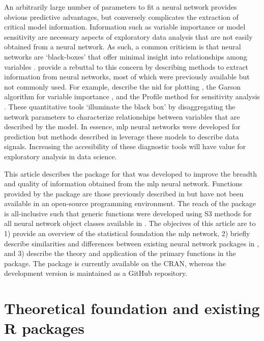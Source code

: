 \documentclass[article,shortnames]{jss}\usepackage[]{graphicx}\usepackage[]{color}
\begin{document}
An arbitrarily large number of parameters to fit a neural network provides obvious predictive advantages, but conversely complicates the extraction of critical model information.  Information such as variable importance or model sensitivity are necessary aspects of exploratory data analysis that are not easily obtained from a neural network. As such, a common criticism is that neural networks are `black-boxes' that offer minimal insight into relationships among variables \citep[e.g.,][]{Paruelo97}.  \citet{Olden02} provide a rebuttal to this concern by describing methods to extract information from neural networks, most of which were previously available but not commonly used.  For example, \citet{Olden02} describe  the \ac{nid} for plotting \citep{Ozesmi99}, the Garson algorithm for variable importance \citep{Garson91}, and the Profile method for sensitivity analysis \citep{Lek96}.  These quantitative tools `illuminate the black box' by disaggregating the network parameters to characterize relationships between variables that are described by the model.  In essence, \ac{mlp} neural networks were developed for prediction but methods described in \citep{Olden02} leverage these models to describe data signals.  Increasing the accesibility of these diagnostic tools will have value for exploratory analysis in data science.

This article describes the  package for  that was developed to improve the breadth and quality of information obtained from the \ac{mlp} neural network.  Functions provided by the package are those previously described in \citep{Olden02} but have not been available in an open-source programming environment.  The reach of the package is all-inclusive such that generic functions were developed using S3 methods for all neural network object classes available in .  The objecives of this article are to 1) provide an overview of the statistical foundation the \ac{mlp} network, 2) briefly describe similarities and differences between existing neural network packages in , and 3) describe the theory and application of the primary functions in the  package.  The package is currently available on the \ac{CRAN}, whereas the development version is maintained as a GitHub repository.  

\section[Theoretical foundation]{Theoretical foundation and existing R packages}
\end{document}
